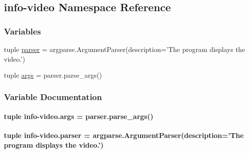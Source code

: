 \hypertarget{namespaceinfo-video}{\subsection{info-\/video Namespace Reference}
\label{namespaceinfo-video}
}
\subsubsection*{Variables}
\begin{DoxyCompactItemize}
\item 
tuple \hyperlink{namespaceinfo-video_abe4e1bf478ad1b6994b2fba0ee73cd87}{parser} = argparse.\-Argument\-Parser(description='The program displays the video.')
\item 
tuple \hyperlink{namespaceinfo-video_a3a00fb720e79cb58a6230233abc3a364}{args} = parser.\-parse\-\_\-args()
\end{DoxyCompactItemize}


\subsubsection{Variable Documentation}
\hypertarget{namespaceinfo-video_a3a00fb720e79cb58a6230233abc3a364}{
\paragraph[{args}]{\setlength{\rightskip}{0pt plus 5cm}tuple info-\/video.\-args = parser.\-parse\-\_\-args()}}\label{namespaceinfo-video_a3a00fb720e79cb58a6230233abc3a364}
\hypertarget{namespaceinfo-video_abe4e1bf478ad1b6994b2fba0ee73cd87}{
\paragraph[{parser}]{\setlength{\rightskip}{0pt plus 5cm}tuple info-\/video.\-parser = argparse.\-Argument\-Parser(description='The program displays the video.')}}\label{namespaceinfo-video_abe4e1bf478ad1b6994b2fba0ee73cd87}
